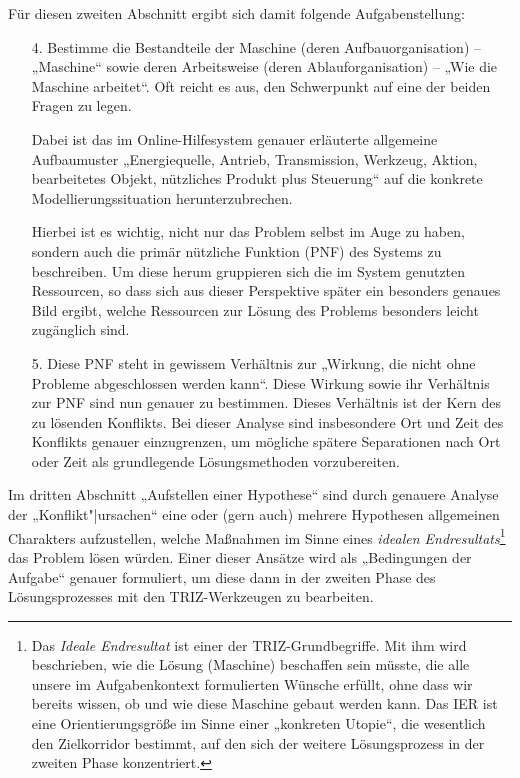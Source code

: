 \documentclass[11pt,a4paper]{article}
\begin{document}
Für diesen zweiten Abschnitt ergibt sich damit folgende Aufgabenstellung:
\begin{itemize}
\item [4.] Bestimme die Bestandteile der Maschine (deren Aufbauorganisation)
  -- „Maschine“ sowie deren Arbeitsweise (deren Ablauforganisation) -- „Wie
  die Maschine arbeitet“. Oft reicht es aus, den Schwerpunkt auf eine der
  beiden Fragen zu legen.

  Dabei ist das im Online-Hilfesystem genauer erläuterte allgemeine
  Aufbaumuster „Energiequelle, Antrieb, Transmission, Werkzeug, Aktion,
  bearbeitetes Objekt, nützliches Produkt plus Steuerung“ auf die konkrete
  Modellierungssituation herunterzubrechen.
  
  Hierbei ist es wichtig, nicht nur das Problem selbst im Auge zu haben,
  sondern auch die primär nützliche Funktion (PNF) des Systems zu beschreiben.
  Um diese herum gruppieren sich die im System genutzten Ressourcen, so dass
  sich aus dieser Perspektive später ein besonders genaues Bild ergibt, welche
  Ressourcen zur Lösung des Problems besonders leicht zugänglich sind. 

\item [5.] Diese PNF steht in gewissem Verhältnis zur „Wirkung, die nicht ohne
  Probleme abgeschlossen werden kann“. Diese Wirkung sowie ihr Verhältnis zur
  PNF sind nun genauer zu bestimmen. Dieses Verhältnis ist der Kern des zu
  lösenden Konflikts.  Bei dieser Analyse sind insbesondere Ort und Zeit des
  Konflikts genauer einzugrenzen, um mögliche spätere Separationen nach Ort
  oder Zeit als grundlegende Lösungsmethoden vorzubereiten. 
\end{itemize}

Im dritten Abschnitt „Aufstellen einer Hypothese“ sind durch genauere Analyse
der „Konflikt"|ursachen“ eine oder (gern auch) mehrere Hypothesen allgemeinen
Charakters aufzustellen, welche Maßnahmen im Sinne eines \emph{idealen
  Endresultats}\footnote{Das \emph{Ideale Endresultat} ist einer der
  TRIZ-Grundbegriffe. Mit ihm wird beschrieben, wie die Lösung (Maschine)
  beschaffen sein müsste, die alle unsere im Aufgabenkontext formulierten
  Wünsche erfüllt, ohne dass wir bereits wissen, ob und wie diese Maschine
  gebaut werden kann.  Das IER ist eine Orientierungsgröße im Sinne einer
  „konkreten Utopie“, die wesentlich den Zielkorridor bestimmt, auf den sich
  der weitere Lösungsprozess in der zweiten Phase konzentriert.} das Problem
lösen würden.  Einer dieser Ansätze wird als „Bedingungen der Aufgabe“ genauer
formuliert, um diese dann in der zweiten Phase des Lösungsprozesses mit den
TRIZ-Werkzeugen zu bearbeiten.
\end{document}
